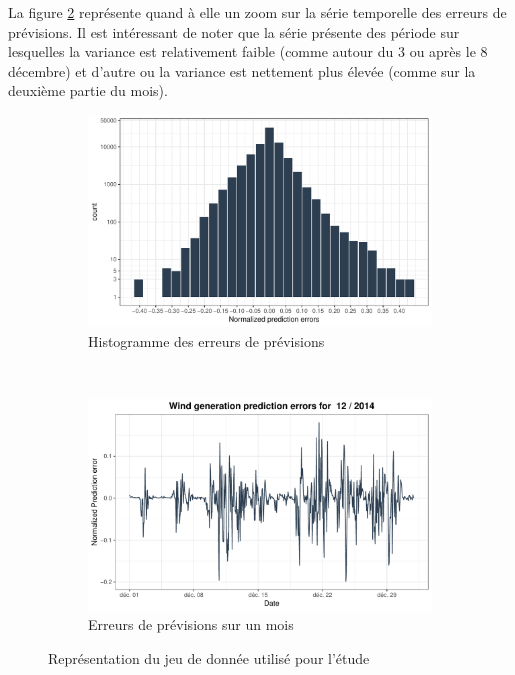 \documentclass[12pt]{report}
\begin{document}
La figure \ref{fig::Data_Eolien_BPA_NormWindErrs_1Month} représente quand à elle un zoom sur la série temporelle des erreurs de prévisions. Il est intéressant de noter que la série présente des période sur lesquelles la variance est relativement faible (comme autour du 3 ou après le 8 décembre) et d'autre ou la variance est nettement plus élevée (comme sur la deuxième partie du mois).

\begin{figure}[htbp]
	\begin{center}
		\begin{subfigure}[b]{0.45\textwidth}
			\includegraphics[width=\textwidth]{Images/Data/Eolien/BPA/Hist_NormErr.pdf}
			\caption{Histogramme des erreurs de prévisions}
			\label{fig::Data_Eolien_BPA_HistNormERR}
		\end{subfigure}
		~
		\begin{subfigure}[b]{0.45\textwidth}
			\includegraphics[width=\textwidth]{Images/Data/Eolien/BPA/NormWindErrs_1Month.pdf}
			\caption{Erreurs de prévisions sur un mois}
			\label{fig::Data_Eolien_BPA_NormWindErrs_1Month}
		\end{subfigure}
		\caption{Représentation du jeu de donnée utilisé pour l'étude}
		\label{fig::Data_BPA_HitsZoom}	
	\end{center}
\end{figure}
\end{document}
